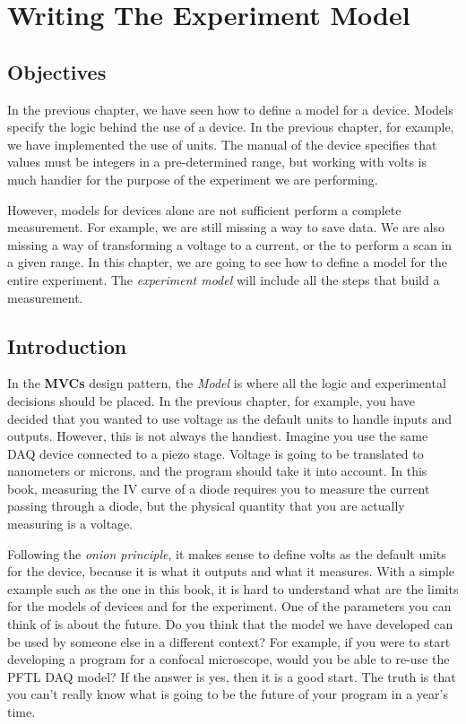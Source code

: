 \chapter{Writing The Experiment Model}\label{chapter:experiment-model}

\section{Objectives}
In the previous chapter, we have seen how to define a model for a device. Models specify the logic behind the use of a device. In the previous chapter, for example, we have implemented the use of units. The manual of the device specifies that values must be integers in a pre-determined range, but working with volts is much handier for the purpose of the experiment we are performing. 

However, models for devices alone are not sufficient perform a complete measurement. For example, we are still missing a way to save data. We are also missing a way of transforming a voltage to a current, or the to perform a scan in a given range. In this chapter, we are going to see how to define a model for the entire experiment. The \emph{experiment model} will include all the steps that build a measurement.

\section{Introduction}
In the \textbf{MVCs} design pattern, the \emph{Model} is where all the logic and experimental decisions should be placed. In the previous chapter, for example, you have decided that you wanted to use voltage as the default units to handle inputs and outputs. However, this is not always the handiest. Imagine you use the same {DAQ} device connected to a piezo stage. Voltage is going to be translated to nanometers or microns, and the program should take it into account. In this book, measuring the IV curve of a diode requires you to measure the current passing through a diode, but the physical quantity that you are actually measuring is a voltage.

Following the \emph{onion principle}, it makes sense to define volts as the default units for the device, because it is what it outputs and what it measures. With a simple example such as the one in this book, it is hard to understand what are the limits for the models of devices and for the experiment. One of the parameters you can think of is about the future. Do you think that the model we have developed can be used by someone else in a different context? For example, if you were to start developing a program for a confocal microscope, would you be able to re-use the {PFTL DAQ} model? If the answer is yes, then it is a good start. The truth is that you can't really know what is going to be the future of your program in a year's time.


